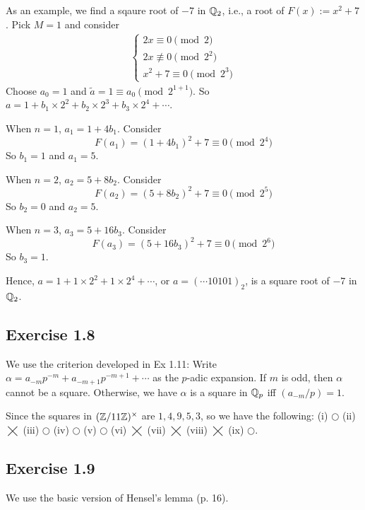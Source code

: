 \documentclass[../Koblitz.tex]{subfiles}
\begin{document}
As an example, we find a sqaure root of $-7$ in $\mathbb{Q}_2$, i.e., a root of $F(x):=x^2+7$. Pick $M=1$ and consider
\begin{align*}
\begin{cases*}
2x\equiv 0 \pmod{2} \\
2x\not\equiv 0 \pmod{2^2} \\
x^2+7\equiv 0 \pmod{2^3}
\end{cases*}
\end{align*}
Choose $a_0=1$ and $\tilde{a}=1\equiv a_0 \pmod{2^{1+1}}$. So $a=1+b_1\times2^2+b_2\times2^3+b_3\times2^4+\cdots$.

When $n=1$, $a_1=1+4b_1$. Consider $$F(a_1)=(1+4b_1)^2+7\equiv 0\pmod{2^4}$$ So $b_1=1$ and $a_1=5$.

When $n=2$, $a_2=5+8b_2$. Consider $$F(a_2)=(5+8b_2)^2+7\equiv 0\pmod{2^5}$$ So $b_2=0$ and $a_2=5$.

When $n=3$, $a_3=5+16b_3$. Consider $$F(a_3)=(5+16b_3)^2+7\equiv 0\pmod{2^6}$$ So $b_3=1$.

Hence, $a=1+1\times2^2+1\times2^4+\cdots$, or $a=(\cdots10101)_2$, is a square root of $-7$ in $\mathbb{Q}_2$.

\subsection*{Exercise 1.8}

We use the criterion developed in Ex 1.11: Write $\alpha=a_{-m}p^{-m}+a_{-m+1}p^{-m+1}+\cdots$ as the $p$-adic expansion. If $m$ is odd, then $\alpha$ cannot be a square. Otherwise, we have $\alpha$ is a square in $\mathbb{Q}_p$ iff $(a_{-m}/p)=1$.

Since the squares in $(\mathbb{Z}/11\mathbb{Z})^\times$ are $1,4,9,5,3$, so we have the following: (i) $\bigcirc$ (ii) $\bigtimes$ (iii) $\bigcirc$ (iv) $\bigcirc$ (v) $\bigcirc$ (vi) $\bigtimes$ (vii) $\bigtimes$ (viii) $\bigtimes$ (ix) $\bigcirc$.

\subsection*{Exercise 1.9}

We use the basic version of Hensel's lemma (p. 16).
\end{document}
